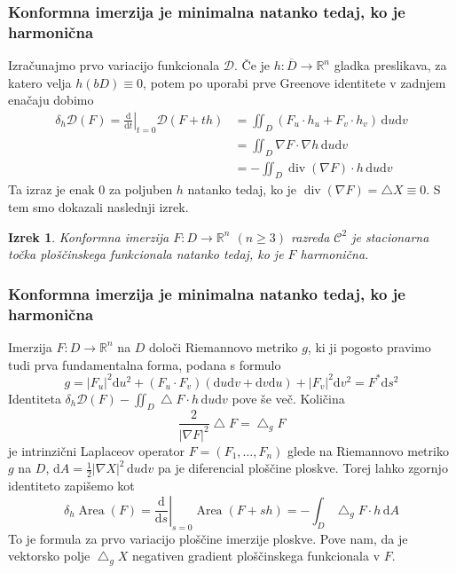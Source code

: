 \documentclass[8pt]{beamer}
\theoremstyle{definition}
\theoremstyle{remark}
\theoremstyle{plain}
\newtheorem{izrek}[definicija]{Izrek}
\numberwithin{equation}{section}  %
\begin{document}
\begin{frame}
    \frametitle{Konformna imerzija je minimalna natanko tedaj, ko je harmonična}

    Izračunajmo prvo variacijo funkcionala $\mathscr{D}$. Če je $h: \overline{D} \rightarrow \mathbb{R}^n$ gladka preslikava, za katero velja $h(bD)\equiv 0$, potem po uporabi prve Greenove identitete v zadnjem enačaju dobimo
    \begin{align*}
        \delta_h \mathscr{D}(F)=\left.\frac{\mathrm{d}}{\mathrm{d} t}\right|_{t=0} \mathscr{D}(F+t h) &=\iint_D\left(F_u \cdot h_u+F_v \cdot h_v\right) \, \mathrm{d} u \mathrm{d} v \\
        &=\iint_D \nabla F \cdot \nabla h \, \mathrm{d} u \mathrm{d} v \\
        &=-\iint_D \operatorname{div}(\nabla F) \cdot h \, \mathrm{d} u \mathrm{d} v
    \end{align*}
    Ta izraz je enak $0$ za poljuben $h$ natanko tedaj, ko je $\operatorname{div}(\nabla F)= \bigtriangleup X \equiv 0$. S tem smo dokazali naslednji izrek.
    \begin{izrek}
        Konformna imerzija $F: D \rightarrow \mathbb{R}^n$ $(n \geq 3)$ razreda $\mathscr{C}^2$ je stacionarna točka ploščinskega funkcionala natanko tedaj, ko je $F$ harmonična.
    \end{izrek}

\end{frame}

\begin{frame}
    \frametitle{Konformna imerzija je minimalna natanko tedaj, ko je harmonična}
    Imerzija $F: D \rightarrow \mathbb{R}^n$ na $D$ določi Riemannovo metriko $g$, ki ji pogosto pravimo tudi prva fundamentalna forma, podana s formulo
    \begin{equation*}
        g=\left|F_u\right|^2 \mathrm{d} u^2+\left(F_u \cdot F_v\right)(\mathrm{d} u \mathrm{d} v+\mathrm{d} v \mathrm{d} u)+\left|F_v\right|^2 \mathrm{d} v^2 = F^* \mathrm{d}s^2    
    \end{equation*}
    Identiteta $\delta_h \mathscr{D}(F)-\iint_D \bigtriangleup F \cdot h \, \mathrm{d} u \mathrm{d} v$ pove še več. Količina
    \begin{equation*}
        \frac{2}{\left| \nabla F\right|^2} \bigtriangleup F=\bigtriangleup_g F       
    \end{equation*}
    je intrinzični Laplaceov operator $F=\left(F_1, \ldots, F_n\right)$ glede na Riemannovo metriko $g$ na $D$, $\mathrm{d} A=\frac{1}{2}|\nabla X|^2 \, \mathrm{d} u \mathrm{d} v$ pa je diferencial ploščine ploskve. Torej lahko zgornjo identiteto zapišemo kot 
    \begin{equation*}
        \delta_h \operatorname{Area}(F)=\left.\frac{\mathrm{d}}{\mathrm{d} s}\right|_{s=0} \operatorname{Area}(F+s h)=-\int_D \bigtriangleup_g F \cdot h \, \mathrm{d} A        
    \end{equation*}
    To je \textcolor{red1}{formula za prvo variacijo ploščine} imerzije ploskve. Pove nam, da je \textcolor{red1}{vektorsko polje} $\bigtriangleup_g X$ \textcolor{red1}{negativen gradient ploščinskega funkcionala v} $F$.  
\end{frame}
\end{document}
